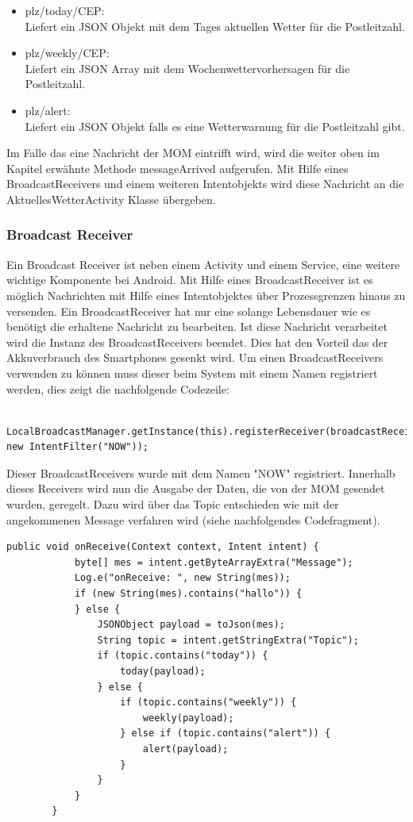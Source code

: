 \begin{itemize}
\item plz/today/CEP:
\\ Liefert ein JSON Objekt mit dem Tages aktuellen Wetter für die Postleitzahl.
\item plz/weekly/CEP:
\\ Liefert ein JSON Array mit dem Wochenwettervorhersagen für die Postleitzahl.
\item plz/alert:
\\ Liefert ein JSON Objekt falls es eine Wetterwarnung für die Postleitzahl gibt.
\end{itemize}
Im Falle das eine Nachricht der MOM eintrifft wird, wird die weiter oben im Kapitel erwähnte Methode messageArrived aufgerufen.
Mit Hilfe eines BroadcastReceivers und einem weiteren Intentobjekts wird diese Nachricht an die AktuellesWetterActivity Klasse übergeben.
\subsubsection{Broadcast Receiver}
\label{subsubsec:BroadcastReceiver}
Ein Broadcast Receiver ist neben einem Activity und einem Service, eine weitere wichtige Komponente bei Android. Mit Hilfe eines BroadcastReceiver ist es möglich Nachrichten mit Hilfe eines Intentobjektes über Prozessgrenzen hinaus zu versenden. Ein BroadcastReceiver hat nur eine solange Lebensdauer wie es benötigt die erhaltene Nachricht zu bearbeiten. Ist diese Nachricht verarbeitet wird die Instanz des BroadcastReceivers beendet. Dies hat den Vorteil das der Akkuverbrauch des Smartphones gesenkt wird. Um einen BroadcastReceivers verwenden zu können muss dieser beim System mit einem Namen registriert werden, dies zeigt die nachfolgende Codezeile:
\begin{lstlisting}
 LocalBroadcastManager.getInstance(this).registerReceiver(broadcastReceiver, new IntentFilter("NOW"));
  \end{lstlisting}
Dieser BroadcastReceivers wurde mit dem Namen "NOW" registriert.
Innerhalb dieses Receivers wird nun die Ausgabe der Daten, die von der MOM gesendet wurden, geregelt. Dazu wird über das Topic entschieden wie mit der angekommenen Message verfahren wird (siehe nachfolgendes Codefragment).
\begin{lstlisting}
public void onReceive(Context context, Intent intent) {
            byte[] mes = intent.getByteArrayExtra("Message");
            Log.e("onReceive: ", new String(mes));
            if (new String(mes).contains("hallo")) {
            } else {
                JSONObject payload = toJson(mes);
                String topic = intent.getStringExtra("Topic");
                if (topic.contains("today")) {
                    today(payload);
                } else {
                    if (topic.contains("weekly")) {
                        weekly(payload);
                    } else if (topic.contains("alert")) {
                        alert(payload);
                    }
                }
            }
        }
  \end{lstlisting}
  
